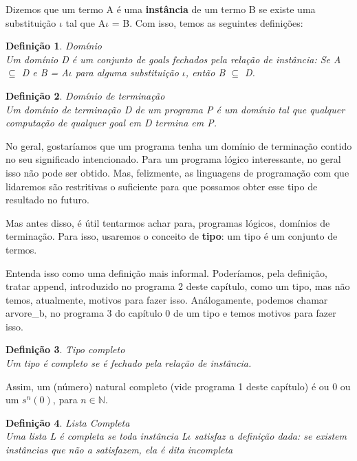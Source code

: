 \documentclass{article}
\newtheorem{definition}{Definição}[section]
\theoremstyle{remark}
\begin{document}
Dizemos que um termo A é uma \textbf{instância} de um termo B se existe uma substituição $\iota$ tal que A$\iota$ = B. Com isso, temos as seguintes definições:

\begin{definition}{Domínio}
  \\Um domínio D é um conjunto de goals fechados pela relação de instância: Se A $\subseteq$ D e B = A$\iota$ para alguma substituição $\iota$, então B $\subseteq$ D.
  \end{definition}

\begin{definition}{Domínio de terminação}
  \\ Um domínio de terminação D de um programa P é um domínio tal que qualquer computação de qualquer goal em D termina em P.
\end{definition}

No geral, gostaríamos que um programa tenha um domínio de terminação contido no seu significado intencionado. Para um programa lógico interessante, no geral isso não pode ser obtido. Mas, felizmente, as linguagens de programação com que lidaremos são restritivas o suficiente para que possamos obter esse tipo de resultado no futuro.

Mas antes disso, é útil tentarmos achar para, programas lógicos, domínios de terminação. Para isso, usaremos o conceito de \textbf{tipo}: um tipo é um conjunto de termos.

Entenda isso como uma definição mais informal. Poderíamos, pela definição, tratar append, introduzido no programa 2 deste capítulo, como um tipo, mas não temos, atualmente, motivos para fazer isso. Análogamente, podemos chamar arvore\_b, no programa 3 do capítulo 0 de um tipo e temos motivos para fazer isso.

\begin{definition}{Tipo completo}
\\ Um tipo é completo se é fechado pela relação de instância.
\end{definition}

Assim, um (número) natural completo (vide programa 1 deste capítulo) é ou 0 ou um $s^n(0)$, para $n \in \mathbb{N}$.

\begin{definition}{Lista Completa}
\\ Uma lista L é completa se toda instância L$\iota$ satisfaz a definição dada: se existem instâncias que não a satisfazem, ela é dita incompleta
\end{definition}
\end{document}
